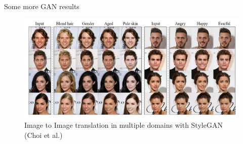 \begin{frame}[allowframebreaks]{Some more GAN results}
\begin{figure}
    \centering
    \includegraphics[height=0.8\textheight, width=\textwidth, keepaspectratio]{images/gan/gan_results_7.png}
    \caption*{Image to Image translation in multiple domains with StyleGAN (Choi et al.)}
\end{figure}
\end{frame}